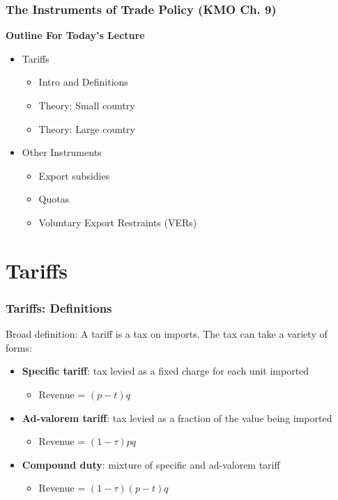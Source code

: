 \documentclass{beamer}
\begin{document}
\begin{frame}
	\frametitle{The Instruments of Trade Policy (KMO Ch. 9)}
\begin{center}
\textbf{Outline For Today's Lecture}
\end{center}
\begin{itemize}
\item Tariffs
\begin{itemize}
\item Intro and Definitions
\item Theory: Small country
\item Theory: Large country
\end{itemize}
\item Other Instruments
\begin{itemize}
	\item Export subsidies
	\item Quotas
	\item Voluntary Export Restraints (VERs)
\end{itemize}
\end{itemize}

\end{frame}

\section{Tariffs}

\begin{frame}
	\frametitle{Tariffs: Definitions}
Broad definition: A tariff is a tax on imports. The tax can take a variety of forms:
\begin{itemize}	\vspace{3mm}
	\item 	\textbf{Specific tariff}: tax levied as a fixed charge for each unit imported
	\begin{itemize}
		\item Revenue = $(p-t)q$\\ \vspace{2mm}
	\end{itemize} 
	\item \textbf{Ad-valorem tariff}: tax levied as a fraction of the value being imported
	\begin{itemize}
		\item Revenue = $(1-\tau)pq$\\ \vspace{2mm}
	\end{itemize} 
	\item \textbf{Compound duty}: mixture of specific and ad-valorem tariff
	\begin{itemize}
		\item Revenue = $(1-\tau)(p-t)q$\\ \vspace{2mm}
	\end{itemize} 
\end{itemize}
	
\end{frame}
\end{document}
